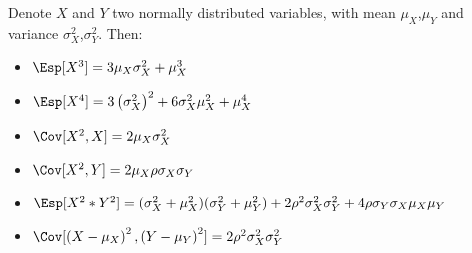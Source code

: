 \documentclass[12pt]{article}
\begin{document}
Denote \(X\) and \(Y\) two normally distributed variables, with mean
\(\mu_X\),\(\mu_Y\) and variance \(\sigma^2_X\),\(\sigma^2_Y\). Then:
\begin{itemize}
\item \(\Esp[X^3]=3 \mu_X \sigma^2_X + \mu_X^3\)
\item \(\Esp[X^4]=3\left(\sigma^2_X\right)^2 + 6 \sigma^2_X \mu_X^2 + \mu_X^4\)
\item \(\Cov[X^2,X]=2 \mu_X \sigma^2_X\)
\item \(\Cov[X^2,Y]=2 \mu_X \rho \sigma_X \sigma_Y\)
\item \(\Esp[X^2*Y^2] = (\sigma^2_X+\mu_X^2)(\sigma^2_Y+\mu_Y^2) + 2 \rho^2 \sigma^2_X \sigma^2_Y + 4 \rho \sigma_Y \sigma_X \mu_X \mu_Y\)
\item \(\Cov[\left(X-\mu_X\right)^2,\left(Y-\mu_Y\right)^2] = 2 \rho^2 \sigma^2_X \sigma^2_Y\)
\end{itemize}
\end{document}
